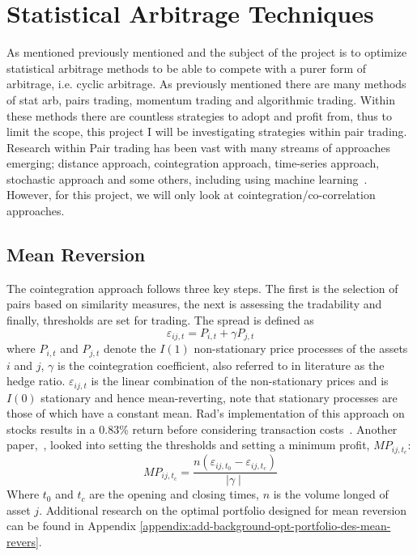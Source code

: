 \section{Statistical Arbitrage Techniques}
As mentioned previously mentioned and the subject of the project is to optimize statistical arbitrage methods to be able to compete with a purer form of arbitrage, i.e. cyclic arbitrage. As previously mentioned there are many methods of stat arb, pairs trading, momentum trading and algorithmic trading. Within these methods there are countless strategies to adopt and profit from, thus to limit the scope, this project I will be investigating strategies within pair trading. Research within Pair trading has been vast with many streams of approaches emerging; distance approach, cointegration approach, time-series approach, stochastic approach and some others, including using machine learning~\cite{https://doi.org/10.1111/joes.12153}. However, for this project, we will only look at cointegration/co-correlation approaches.

\subsection{Mean Reversion}
The cointegration approach follows three key steps. The first is the selection of pairs based on similarity measures, the next is assessing the tradability and finally, thresholds are set for trading. The spread is defined as $$\varepsilon_{i j,t} = P_{i,t} + \gamma P_{j,t}$$ where $P_{i,t}$ and $P_{j,t}$ denote the $I(1)$ non-stationary price processes of the assets $i$ and $j$, $\gamma$ is the cointegration coefficient, also referred to in literature as the hedge ratio. $\varepsilon_{i j,t}$ is the linear combination of the non-stationary prices and is $I(0)$ stationary and hence mean-reverting, note that stationary processes are those of which have a constant mean. Rad's implementation of this approach on stocks results in a 0.83\% return before considering transaction costs~\cite{RadLowFaff}. Another paper,~\cite{lossProtection}, looked into setting the thresholds and setting a minimum profit, $MP_{ij,t_c}$: $$MP_{ij,t_c} = \frac{n(\varepsilon_{i j,t_0} - \varepsilon_{i j,t_c})}{ \mid \gamma \mid}$$ Where $t_0$ and $t_c$ are the opening and closing times, $n$ is the volume longed of asset $j$. Additional research on the optimal portfolio designed for mean reversion can be found in Appendix \ref{appendix:add-background-opt-portfolio-des-mean-revers}.

